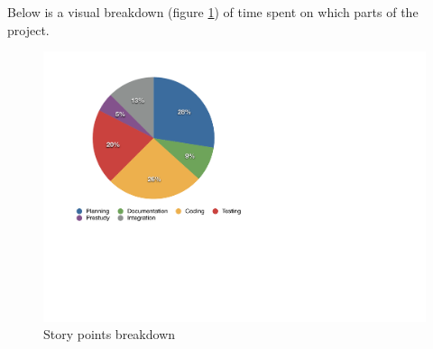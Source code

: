 Below is a visual breakdown (figure \ref{fig:sprints-points}) of time spent on which parts of the project.

\begin{figure}[h!]
\centering \includegraphics[scale=0.8]{img/pie_chart.pdf}
\caption{Story points breakdown}
\label{fig:sprints-points}
\end{figure}
